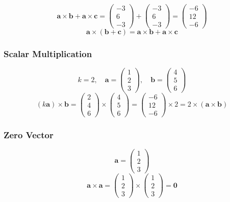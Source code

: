 \documentclass[a4paper,12pt]{article}
\begin{document}
\begin{itemize}[leftmargin=*]
\[\]
\[
\mathbf{a} \times \mathbf{b} + \mathbf{a} \times \mathbf{c} = \begin{pmatrix} -3 \\ 6 \\ -3 \end{pmatrix} + \begin{pmatrix} -3 \\ 6 \\ -3 \end{pmatrix} = \begin{pmatrix} -6 \\ 12 \\ -6 \end{pmatrix}
\]
\[
\mathbf{a} \times (\mathbf{b} + \mathbf{c}) = \mathbf{a} \times \mathbf{b} + \mathbf{a} \times \mathbf{c}
\]

\subsubsection*{Scalar Multiplication}
\[
k = 2, \quad \mathbf{a} = \begin{pmatrix} 1 \\ 2 \\ 3 \end{pmatrix}, \quad \mathbf{b} = \begin{pmatrix} 4 \\ 5 \\ 6 \end{pmatrix}
\]
\[
(k \mathbf{a}) \times \mathbf{b} = \begin{pmatrix} 2 \\ 4 \\ 6 \end{pmatrix} \times \begin{pmatrix} 4 \\ 5 \\ 6 \end{pmatrix} = \begin{pmatrix} -6 \\ 12 \\ -6 \end{pmatrix} \times 2 = 2 \times (\mathbf{a} \times \mathbf{b})
\]

\subsubsection*{Zero Vector}
\[
\mathbf{a} = \begin{pmatrix} 1 \\ 2 \\ 3 \end{pmatrix}
\]
\[
\mathbf{a} \times \mathbf{a} = \begin{pmatrix} 1 \\ 2 \\ 3 \end{pmatrix} \times \begin{pmatrix} 1 \\ 2 \\ 3 \end{pmatrix} = \mathbf{0}
\]


\end{itemize}
\end{document}
